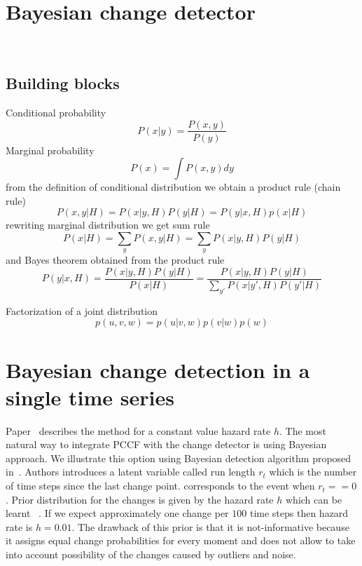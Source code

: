 \section{Bayesian change detector}
~\cite{DowneyChp}
~\cite{MacKay_Inference_Book}
~\cite{gelman2013bayesian}
\subsection{Building blocks}
Conditional probability
\begin{equation} \label{eq:conditional_probability}
P(x|y) = \frac{P(x,y)}{P(y)}
\end{equation}
Marginal probability
\begin{equation}
P(x) = \int P(x,y) dy
\end{equation}
from the definition of conditional distribution we obtain a product rule
(chain rule)
\begin{equation}
P(x,y|H) = P(x|y,H) P(y|H) = P(y|x,H) p(x|H)
\end{equation}
rewriting marginal distribution we get sum rule
\begin{equation}
P(x|H) = \sum_y P(x,y|H) = \sum_y P(x|y,H)P(y|H)
\end{equation}
and Bayes theorem obtained from the product rule
\begin{equation}
P(y|x,H) = \frac{P(x|y,H) P(y|H)}{P(x|H)} = \frac{P(x|y,H) P(y|H)}{ \sum_{y'} P(x|y',H) P(y'|H) }
\end{equation}

Factorization of a joint distribution
\[
p(u,v,w) = p(u|v,w)p(v|w)p(w)
\]

\section{Bayesian \online change detection in a single time series}
Paper~\cite{mackay2007} describes the method for a constant value hazard rate $h$.
The most natural way to integrate PCCF with the change detector is using Bayesian approach.
We illustrate this option using Bayesian \online \changepoint detection algorithm proposed in~\cite{mackay2007}.
Authors introduces a latent variable called run length $r_t$ which is the number of time steps since the last change point.
\Changepoint corresponds to the event when $r_t == 0$.
Prior distribution for the changes is given by the hazard rate $h$ which can be learnt \online~\cite{Wilson2010a}.
If we expect approximately one change per $100$ time steps then hazard rate is $h = 0.01$.
The drawback of this prior is that it is not-informative because it assigns equal change probabilities for every moment and does not allow to take into account possibility of the changes caused by outliers and noise.

